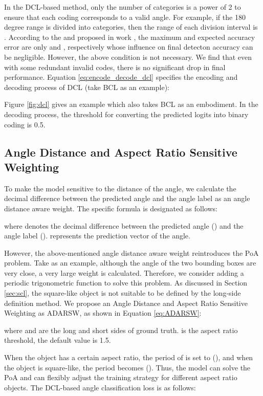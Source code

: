 \documentclass[final]{cvpr}
\begin{document}
In the DCL-based method, only the number of categories is a power of 2 to ensure that each coding corresponds to a valid angle. For example, if the 180 degree range is divided into  categories, then the range of each division interval is . According to the  and  proposed in work \cite{yang2020arbitrary}, the maximum and expected accuracy error are only  and , respectively whose influence on final detecton accuracy can be negligible. However, the above condition is not necessary. We find that even with some redundant invalid codes, there is no significant drop in final performance. Equation \ref{eq:encode_decode_dcl} specifies the encoding and decoding process of DCL (take BCL as an example):


Figure \ref{fig:dcl} gives an example which also takes BCL as an embodiment. In the decoding process, the threshold for converting the predicted logits into binary coding is 0.5.

\subsection{Angle Distance and Aspect Ratio Sensitive Weighting}
To make the model sensitive to the distance of the angle, we calculate the decimal difference between the predicted angle and the angle label as an angle distance aware weight. The specific formula is designated as follows:

where  denotes the decimal difference between the predicted angle () and the angle label ().  represents the prediction vector of the angle.

However, the above-mentioned angle distance aware weight reintroduces the PoA problem. Take  as an example, although the angle of the two bounding boxes are very close, a very large weight is calculated. Therefore, we consider adding a periodic trigonometric function to solve this problem. As discussed in Section \ref{sec:scl}, the square-like object is not suitable to be defined by the long-side definition method. We propose an Angle Distance and Aspect Ratio Sensitive Weighting as ADARSW, as shown in Equation \ref{eq:ADARSW}:

where  and  are the long and short sides of ground truth.  is the aspect ratio threshold, the default value is 1.5. 

When the object has a certain aspect ratio, the period of  is set to  (), and when the object
is square-like, the period becomes  (). Thus, the model can solve the PoA and can flexibly adjust the training strategy for different aspect ratio objects.
The DCL-based angle classification loss is as follows:
\end{document}
